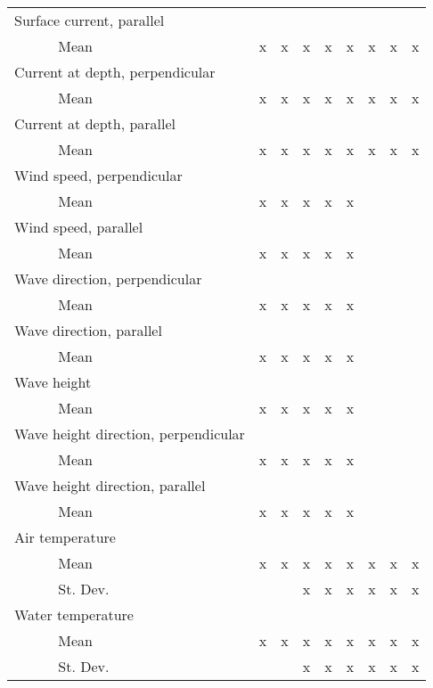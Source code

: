 \documentclass[12pt]{article}
\begin{document}
\begin{table}
{\begin{minipage}{\textwidth}
\begin{tabular}{ll|cccccccc}
        \hline
        \multicolumn{2}{l|}{Surface current, parallel} &&&&&&&& \\
        & Mean & x & x & x & x & x & x & x & x \\
        \hline
        \multicolumn{2}{l|}{Current at depth, perpendicular} &&&&&&&& \\
        & Mean & x & x & x & x & x & x & x & x \\
        \hline
        \multicolumn{2}{l|}{Current at depth, parallel} &&&&&&&& \\
        & Mean & x & x & x & x & x & x & x & x \\
        \hline
        \multicolumn{2}{l|}{Wind speed, perpendicular} &&&&&&&& \\
        & Mean & x & x & x & x & x & & & \\
        \hline
        \multicolumn{2}{l|}{Wind speed, parallel} &&&&&&&& \\
        & Mean & x & x & x & x & x & & & \\
        \hline
        \multicolumn{2}{l|}{Wave direction, perpendicular} &&&&&&&& \\
        & Mean & x & x & x & x & x & & & \\
        \hline
        \multicolumn{2}{l|}{Wave direction, parallel} &&&&&&&& \\
        & Mean & x & x & x & x & x & & & \\
        \hline
        \multicolumn{2}{l|}{Wave height} &&&&&&&& \\
        & Mean & x & x & x & x & x & & & \\
        \hline
        \multicolumn{2}{l|}{Wave height direction, perpendicular} &&&&&&&& \\
        & Mean & x & x & x & x & x & & & \\
        \hline
        \multicolumn{2}{l|}{Wave height direction, parallel} &&&&&&&& \\
        & Mean & x & x & x & x & x & & & \\
        \hline
        \multicolumn{2}{l|}{Air temperature} &&&&&&&& \\
        & Mean & x & x & x & x & x & x & x & x \\
        & St. Dev. & & & x & x & x & x & x & x \\
        \hline
        \multicolumn{2}{l|}{Water temperature} &&&&&&&& \\
        & Mean & x & x & x & x & x & x & x & x \\
        & St. Dev. & & & x & x & x & x & x & x \\

\end{tabular}
\end{minipage}}
\end{table}
\end{document}
